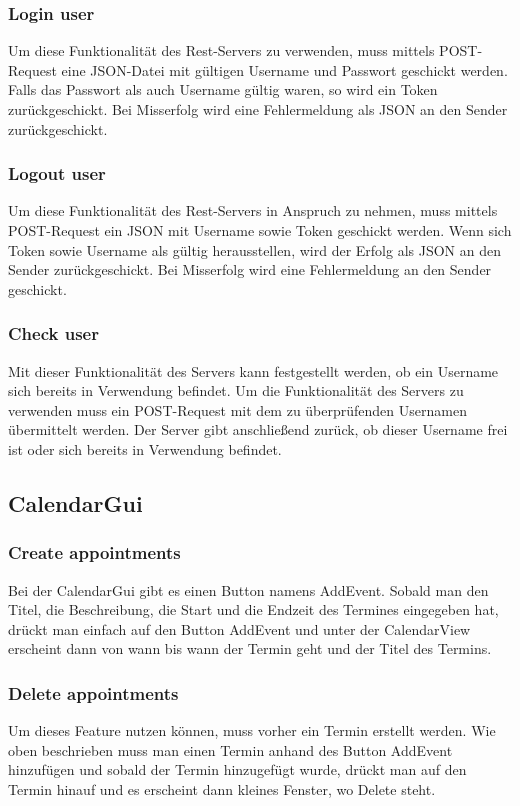 \documentclass[12pt]{scrartcl}
\begin{document}
    \subsubsection{Login user}
        Um diese Funktionalität des Rest-Servers zu verwenden, muss mittels POST-Request eine 
        JSON-Datei mit gültigen Username und Passwort geschickt werden.
        Falls das Passwort als auch Username gültig waren, so wird ein Token zurückgeschickt.
        Bei Misserfolg wird eine Fehlermeldung als JSON an den Sender zurückgeschickt.

    \subsubsection{Logout user}
        Um diese Funktionalität des Rest-Servers in Anspruch zu nehmen, muss mittels POST-Request ein JSON mit Username 
        sowie Token geschickt werden. Wenn sich Token sowie Username als gültig herausstellen, wird 
        der Erfolg als JSON an den Sender zurückgeschickt. Bei Misserfolg wird eine Fehlermeldung an den Sender 
        geschickt.
    \subsubsection{Check user}
        Mit dieser Funktionalität des Servers kann festgestellt werden, ob ein Username sich bereits in Verwendung 
        befindet. Um die Funktionalität des Servers zu verwenden muss ein POST-Request mit dem zu überprüfenden 
        Usernamen übermittelt werden.
        Der Server gibt anschließend zurück, ob dieser Username frei ist oder sich bereits in Verwendung befindet.

    \subsection{CalendarGui}
    \subsubsection{Create appointments}
        Bei der CalendarGui gibt es einen Button namens AddEvent. Sobald man den Titel, die Beschreibung, die Start und
        die Endzeit des Termines eingegeben hat, drückt man einfach auf den Button AddEvent und unter der CalendarView erscheint
        dann von wann bis wann der Termin geht und der Titel des Termins.
        
    \subsubsection{Delete appointments}
        Um dieses Feature nutzen können, muss vorher ein Termin erstellt werden. Wie oben beschrieben muss man einen Termin
        anhand des Button AddEvent hinzufügen und sobald der Termin hinzugefügt wurde, drückt man auf den Termin hinauf und
        es erscheint dann kleines Fenster, wo Delete steht.    
        
\end{document}
